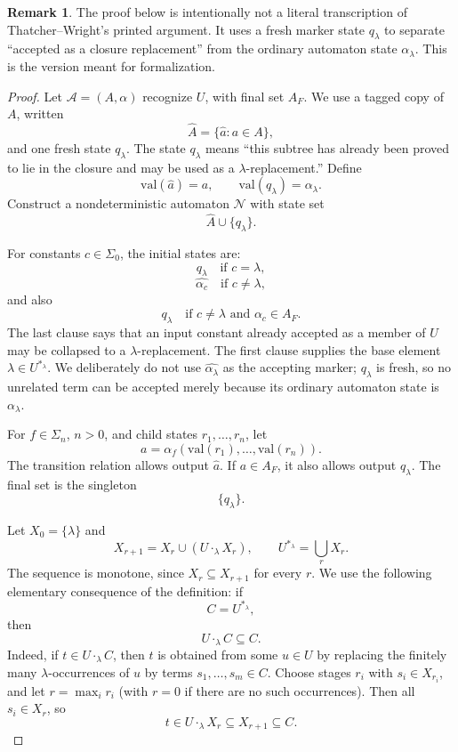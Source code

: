 \documentclass[11pt]{article}
\theoremstyle{definition}
\newtheorem{remark}[theorem]{Remark}
\newcommand{\TW}{Thatcher--Wright}
\newcommand{\SigmaSym}{\Sigma}
\newcommand{\Aut}{\mathcal A}
\begin{document}
\begin{remark}
The proof below is intentionally not a literal transcription of \TW{}'s printed
argument.  It uses a fresh marker state \(q_\lambda\) to separate ``accepted as a
closure replacement'' from the ordinary automaton state \(\alpha_\lambda\).  This
is the version meant for formalization.
\end{remark}

\begin{proof}
Let \(\Aut=(A,\alpha)\) recognize \(U\), with final set \(A_F\).  We use a
tagged copy of \(A\), written
\[
  \widehat A=\{\widehat a:a\in A\},
\]
and one fresh state \(q_\lambda\).  The state \(q_\lambda\) means ``this subtree
has already been proved to lie in the closure and may be used as a
\(\lambda\)-replacement.''  Define
\[
  \mathrm{val}(\widehat a)=a,
  \qquad
  \mathrm{val}(q_\lambda)=\alpha_\lambda.
\]
Construct a nondeterministic automaton \(\mathcal N\) with state set
\[
  \widehat A\cup\{q_\lambda\}.
\]

For constants \(c\in\SigmaSym_0\), the initial states are:
\[
  q_\lambda \quad\text{if } c=\lambda,
\]
\[
  \widehat{\alpha_c} \quad\text{if } c\ne\lambda,
\]
and also
\[
  q_\lambda \quad\text{if } c\ne\lambda\text{ and }\alpha_c\in A_F.
\]
The last clause says that an input constant already accepted as a member of
\(U\) may be collapsed to a \(\lambda\)-replacement.  The first clause supplies
the base element \(\lambda\in U^{*_\lambda}\).  We deliberately do not use
\(\widehat{\alpha_\lambda}\) as the accepting marker; \(q_\lambda\) is fresh, so
no unrelated term can be accepted merely because its ordinary automaton state is
\(\alpha_\lambda\).

For \(f\in\SigmaSym_n\), \(n>0\), and child states \(r_1,\ldots,r_n\), let
\[
  a=\alpha_f(\mathrm{val}(r_1),\ldots,\mathrm{val}(r_n)).
\]
The transition relation allows output \(\widehat a\).  If \(a\in A_F\), it also
allows output \(q_\lambda\).  The final set is the singleton
\[
  \{q_\lambda\}.
\]

Let \(X_0=\{\lambda\}\) and
\[
  X_{r+1}=X_r\cup(U\cdot_\lambda X_r),
  \qquad
  U^{*_\lambda}=\bigcup_r X_r.
\]
The sequence is monotone, since \(X_r\subseteq X_{r+1}\) for every \(r\).
We use the following elementary consequence of the definition: if
\[
  C=U^{*_\lambda},
\]
then
\[
  U\cdot_\lambda C\subseteq C.              \tag{1}
\]
Indeed, if \(t\in U\cdot_\lambda C\), then \(t\) is obtained from some
\(u\in U\) by replacing the finitely many \(\lambda\)-occurrences of \(u\) by
terms \(s_1,\ldots,s_m\in C\).  Choose stages \(r_i\) with \(s_i\in X_{r_i}\),
and let \(r=\max_i r_i\) (with \(r=0\) if there are no such occurrences).  Then
all \(s_i\in X_r\), so
\[
  t\in U\cdot_\lambda X_r\subseteq X_{r+1}\subseteq C.
\]


\end{proof}
\end{document}
